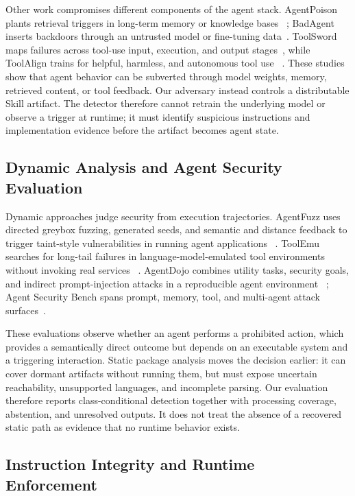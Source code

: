 Other work compromises different components of the agent stack. AgentPoison
plants retrieval triggers in long-term memory or knowledge bases
~\cite{chen2024agentpoison}; BadAgent inserts backdoors through an untrusted
model or fine-tuning data~\cite{wang2024badagent}. ToolSword maps failures across
tool-use input, execution, and output stages~\cite{ye2024toolsword}, while
ToolAlign trains for helpful, harmless, and autonomous tool use
~\cite{chen2024toolalign}. These studies show that agent behavior can be
subverted through model weights, memory, retrieved content, or tool feedback.
Our adversary instead controls a distributable Skill artifact. The detector
therefore cannot retrain the underlying model or observe a trigger at runtime;
it must identify suspicious instructions and implementation evidence before
the artifact becomes agent state.

\subsection{Dynamic Analysis and Agent Security Evaluation}

Dynamic approaches judge security from execution trajectories. AgentFuzz uses
directed greybox fuzzing, generated seeds, and semantic and distance feedback
to trigger taint-style vulnerabilities in running agent applications
~\cite{liu2025agentfuzz}. ToolEmu searches for long-tail failures in
language-model-emulated tool environments without invoking real services
~\cite{ruan2024toolemu}. AgentDojo combines utility tasks, security goals, and
indirect prompt-injection attacks in a reproducible agent environment
~\cite{debenedetti2024agentdojo}; Agent Security Bench spans prompt, memory,
tool, and multi-agent attack surfaces~\cite{zhang2025asb}.

These evaluations observe whether an agent performs a prohibited action, which
provides a semantically direct outcome but depends on an executable system and
a triggering interaction. Static package analysis moves the decision earlier:
it can cover dormant artifacts without running them, but must expose uncertain
reachability, unsupported languages, and incomplete parsing. Our evaluation
therefore reports class-conditional detection together with processing
coverage, abstention, and unresolved outputs. It does not treat the absence of
a recovered static path as evidence that no runtime behavior exists.

\subsection{Instruction Integrity and Runtime Enforcement}

